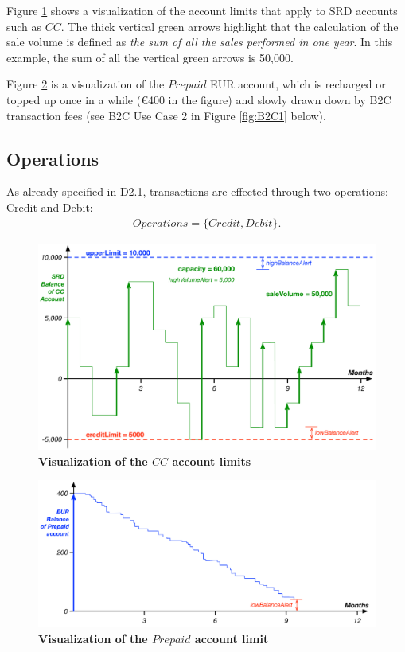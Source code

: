 Figure \ref{fig:accountLimitsCC} shows a visualization of the account limits that apply to SRD accounts such as $CC$. The thick vertical green arrows highlight that the calculation of the sale volume is defined as \emph{the sum of all the sales performed in one year}. In this example, the sum of all the vertical green arrows is 50,000.

Figure \ref{fig:accountLimitsPrepaid} is a visualization of the $Prepaid$ EUR account, which is recharged or topped up once in a while (\euro 400 in the figure) and slowly drawn down by B2C transaction fees (see B2C Use Case 2 in Figure \ref{fig:B2C1} below).

\subsection{Operations}
As already specified in D2.1, transactions are effected through two operations: Credit and Debit:
\begin{align}
Operations = \{ Credit, Debit \}.
\end{align}

\begin{figure}[H]
\centering
\includegraphics[width=15cm]{Figures/Account_Limits_CC}
\caption{\small\textbf{Visualization of the $CC$ account limits}}
\label{fig:accountLimitsCC}
\end{figure}
\vspace{-0.5cm}

\begin{figure}[htbp]
\centering
\includegraphics[width=15cm]{Figures/Account_Limits_Prepaid}
\caption{\small\textbf{Visualization of the $Prepaid$ account limit}}
\label{fig:accountLimitsPrepaid}
\end{figure}
\vspace{-0.5cm}

